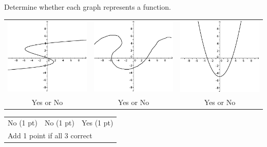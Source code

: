 
{
	Determine whether each graph represents a function.
	\begin{center}
	\begin{tabular}{ccc}
	\includegraphics[scale=1]{fig100-22-b-i.pdf} & \includegraphics[scale=1]{fig100-22-b-ii.pdf} & \includegraphics[scale=1]{fig100-22-b-iii.pdf}\\
	Yes or No & Yes or No & Yes or No
	\end{tabular}
	\end{center}
}
{
	\begin{tabular}{lll}
	No (1 pt) & No (1 pt) & Yes (1 pt)\\
	\multicolumn{3}{l}{Add 1 point if all 3 correct}
	\end{tabular}
}
